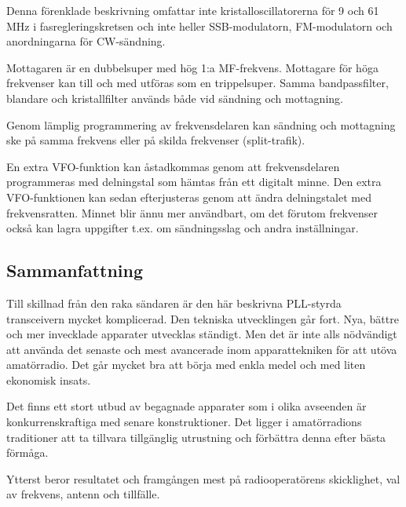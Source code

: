 Denna förenklade beskrivning omfattar inte kristalloscillatorerna för
9 och 61 MHz i fasregleringskretsen och inte heller SSB-modulatorn,
FM-modulatorn och anordningarna för CW-sändning.

Mottagaren är en dubbelsuper med hög 1:a MF-frekvens. Mottagare för
höga frekvenser kan till och med utföras som en trippelsuper. Samma
bandpassfilter, blandare och kristallfilter används både vid sändning
och mottagning.

Genom lämplig programmering av frekvensdelaren kan sändning och
mottagning ske på samma frekvens eller på skilda frekvenser
(split-trafik).

En extra VFO-funktion kan åstadkommas genom att frekvensdelaren
programmeras med delningstal som hämtas från ett digitalt minne. Den
extra VFO-funktionen kan sedan efterjusteras genom att ändra
delningstalet med frekvensratten. Minnet blir ännu mer användbart, om
det förutom frekvenser också kan lagra uppgifter t.ex.  om
sändningsslag och andra inställningar.

\subsection{Sammanfattning}

Till skillnad från den raka sändaren är den här beskrivna PLL-styrda
transceivern mycket komplicerad. Den tekniska utvecklingen går
fort. Nya, bättre och mer invecklade apparater utvecklas ständigt. Men
det är inte alls nödvändigt att använda det senaste och mest
avancerade inom apparattekniken för att utöva amatörradio. Det går
mycket bra att börja med enkla medel och med liten ekonomisk insats.

Det finns ett stort utbud av begagnade apparater som i olika avseenden
är konkurrenskraftiga med senare konstruktioner. Det ligger i
amatörradions traditioner att ta tillvara tillgänglig utrustning och
förbättra denna efter bästa förmåga.

Ytterst beror resultatet och framgången mest på radiooperatörens
skicklighet, val av frekvens, antenn och tillfälle.
